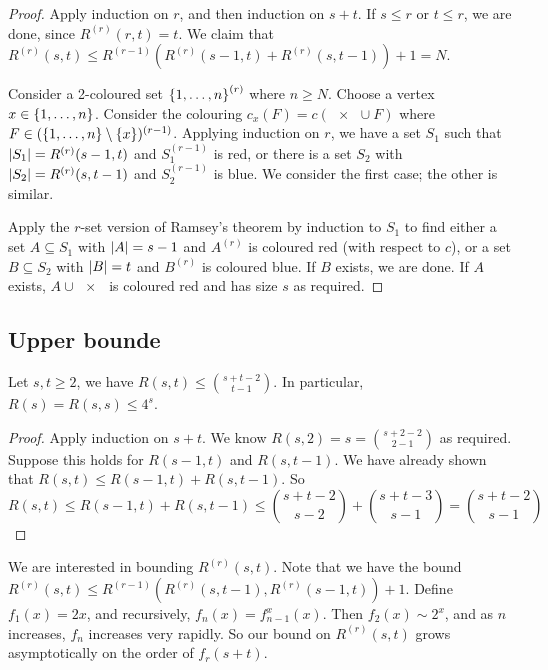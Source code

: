 \begin{proof}
	Apply induction on \( r \), and then induction on \( s + t \).
	If \( s \leq r \) or \( t \leq r \), we are done, since \( R^{(r)}(r,t) = t \).
	We claim that \( R^{(r)}(s,t) \leq R^{(r-1)}(R^{(r)}(s-1,t) + R^{(r)}(s,t-1)) + 1 = N \).

	Consider a 2-coloured set \( \qty{1, \dots, n}^{(r)} \) where \( n \geq N \).
	Choose a vertex \( x \in \qty{1, \dots, n} \).
	Consider the colouring \( c_x(F) = c(\qty{x} \cup F) \) where \( F \in (\qty{1, \dots, n} \setminus \qty{x})^{(r-1)} \).
	Applying induction on \( r \), we have a set \( S_1 \) such that \( \abs{S_1} = R^{(r)}(s-1,t) \) and \( S_1^{(r-1)} \) is red, or there is a set \( S_2 \) with \( \abs{S_2} = R^{(r)}(s,t-1) \) and \( S_2^{(r-1)} \) is blue.
	We consider the first case; the other is similar.

	Apply the \( r \)-set version of Ramsey's theorem by induction to \( S_1 \) to find either a set \( A \subseteq S_1 \) with \( \abs{A} = s - 1 \) and \( A^{(r)} \) is coloured red (with respect to \( c \)), or a set \( B \subseteq S_2 \) with \( \abs{B} = t \) and \( B^{(r)} \) is coloured blue.
	If \( B \) exists, we are done.
	If \( A \) exists, \( A \cup \qty{x} \) is coloured red and has size \( s \) as required.
\end{proof}

\subsection{Upper bounde}
\begin{proposition}
	Let \( s, t \geq 2 \), we have \( R(s,t) \leq \binom{s+t-2}{t-1} \).
	In particular, \( R(s) = R(s,s) \leq 4^s \).
\end{proposition}
\begin{proof}
	Apply induction on \( s + t \).
	We know \( R(s,2) = s = \binom{s+2-2}{2-1} \) as required.
	Suppose this holds for \( R(s-1,t) \) and \( R(s,t-1) \).
	We have already shown that \( R(s,t) \leq R(s-1,t) + R(s,t-1) \).
	So
	\[ R(s,t) \leq R(s-1,t) + R(s,t-1) \leq \binom{s+t-2}{s-2} + \binom{s+t-3}{s-1} = \binom{s+t-2}{s-1} \]
\end{proof}
We are interested in bounding \( R^{(r)}(s,t) \).
Note that we have the bound \( R^{(r)}(s,t) \leq R^{(r-1)}(R^{(r)}(s,t-1), R^{(r)}(s-1,t)) + 1 \).
Define \( f_1(x) = 2x \), and recursively, \( f_n(x) = f_{n-1}^x(x) \).
Then \( f_2(x) \sim 2^x \), and as \( n \) increases, \( f_n \) increases very rapidly.
So our bound on \( R^{(r)}(s,t) \) grows asymptotically on the order of \( f_r(s+t) \).

